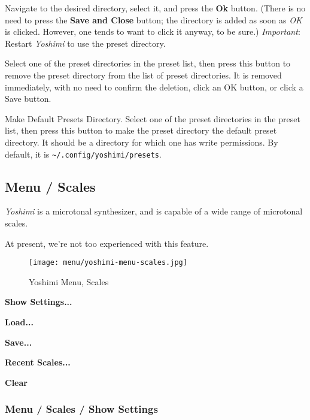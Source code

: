    Navigate to the desired directory, select it, and press the \textbf{Ok}
   button.  (There is no need to press the \textbf{Save and Close} button;
   the directory is added as soon as \textsl{OK} is clicked.  However, one
   tends to want to click it anyway, to be sure.)
   \textsl{Important}:  Restart \textsl{Yoshimi} to use the preset directory.

   Select one of the preset directories in the preset list, then press this
   button to remove the preset directory from the list of preset
   directories.  It is removed immediately, with no need to confirm the
   deletion, click an OK button, or click a Save button.

   Make Default Presets Directory.
   Select one of the preset directories in the preset list, then press this
   button to make the preset directory the default preset directory.
   It should be a directory for which one has write permissions.
   By default, it is \texttt{\textasciitilde/.config/yoshimi/presets}.

\subsection{Menu / Scales}
\label{subsec:menu_scales}

   \textsl{Yoshimi} is a microtonal synthesizer, and is capable of a wide
   range of microtonal scales.

   At present, we're not too experienced with this feature.

\begin{figure}[H]
   \centering 
   \texttt{[image: menu/yoshimi-menu-scales.jpg]}
   \caption{Yoshimi Menu, Scales}
   \label{fig:yoshimi_menu_scales}
\end{figure}

   \begin{enumber}
      \item \textbf{Show Settings...}
      \item \textbf{Load...}
      \item \textbf{Save...}
      \item \textbf{Recent Scales...}
      \item \textbf{Clear}
   \end{enumber}

\subsubsection{Menu / Scales / Show Settings}
\label{subsec:menu_scales_show}

